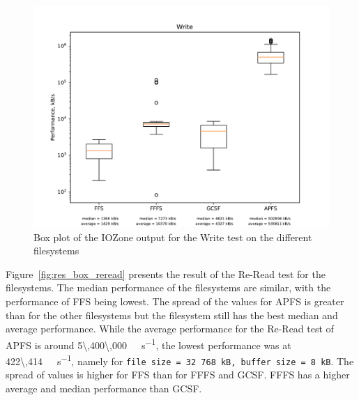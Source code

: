 \begin{figure}[!ht]
	\label{fig:res_box_write}
	\begin{center}
		\includegraphics[width=1.0\textwidth]{figures/benchmarking/Write_box.pdf}
	\end{center}
	\caption{Box plot of the IOZone output for the Write test on the different filesystems}
\end{figure}

\FloatBarrier

Figure~\ref{fig:res_box_reread} presents the result of the \mbox{Re-Read} test for the filesystems. The median performance of the filesystems are similar, with the performance of \gls{FFS} being lowest. The spread of the values for \gls{APFS} is greater than for the other filesystems but the filesystem still has the best median and average performance. While the average performance for the Re-Read test of \gls{APFS} is around \SI[per-mode = symbol]{5\,400\,000}{\kilo\byte\per\second}, the lowest performance was at \SI[per-mode = symbol]{422\,414}{\kilo\byte\per\second}, namely for \texttt{file size = 32\,768\,kB, buffer size = 8\,kB}. The spread of values is higher for \gls{FFS} than for \gls{FFFS} and \gls{GCSF}. \gls{FFFS} has a higher average and median performance than \gls{GCSF}.

